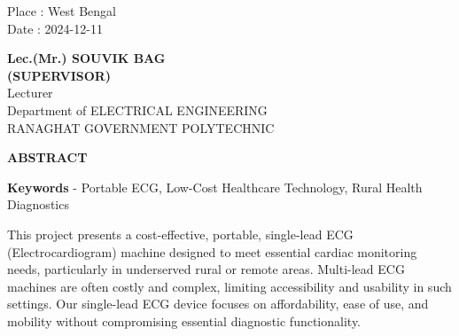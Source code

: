 \documentclass[12pt,a4paper]{report}
\begin{document}
\noindent \begin{minipage}{4cm}
\begin{flushleft}
\vspace{1 cm}
                         
Place : West Bengal \\
Date : 2024-12-11 \\

\end{flushleft} 
\end{minipage}
\hfill
\begin{minipage}{10cm}
\begin{flushright}                                      
\vspace{2cm}
                         

\vspace{.8cm}
\textbf{Lec.(Mr.) SOUVIK BAG}\\
\textbf{(SUPERVISOR)}\\
Lecturer\\
Department of ELECTRICAL ENGINEERING \\
RANAGHAT GOVERNMENT POLYTECHNIC\\
\end{flushright} 
\end{minipage}

\newpage


\begin{center}
 \textbf{ABSTRACT}
\end{center}

\textbf{Keywords} - Portable ECG, Low-Cost Healthcare Technology, Rural Health Diagnostics

\vspace{0.8cm}

This project presents a cost-effective, portable, single-lead ECG (Electrocardiogram) machine designed to meet essential cardiac monitoring needs, particularly in underserved rural or remote areas. Multi-lead ECG machines are often costly and complex, limiting accessibility and usability in such settings. Our single-lead ECG device focuses on affordability, ease of use, and mobility without compromising essential diagnostic functionality.
\end{document}

